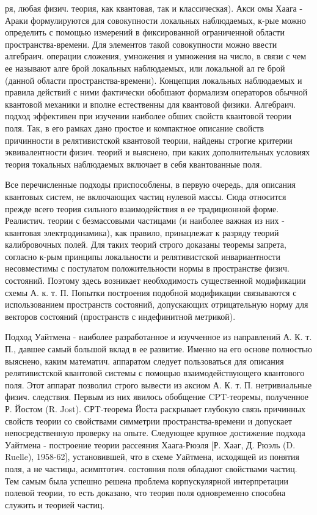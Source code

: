 \documentclass[10pt]{article}
\begin{document}
ря, любая физич. теория, как квантовая, так и классическая). Акси омы Хаага - Араки формулируются для совокупности локальных наблюдаемых, к-рые можно определить с помощью измерений в фиксированной ограниченной области пространства-времени. Для элементов такой совокупности можно ввести алгебраич. операции сложения, умножения и умножения на число, в связи с чем ее называют алге брой локальных наблюдаемых, или локальной ал ге брой (данной области пространства-времени). Концепция локальных наблюдаемых и правила действий с ними фактически обобшают формализм операторов обычной квантовой механики и вполне естественны для квантовой физики. Алгебраич. подход эффективен при изучении наиболее обших свойств квантовой теории поля. Так, в его рамках дано простое и компактное описание свойств причинности в релятивистской квантовой теории, найдены строгие критерии эквивалентности физич. теорий и выяснено, при каких дополнительных условиях теория токальных наблюдаемых включает в себя квантованные поля.



Все перечисленные подходы приспособлены, в первую очередь, для описания квантовых систем, не включающих частиц нулевой массы. Сюда относится прежде всего теория сильного взаимодействия в ее традиционной форме. Реалистич. теории с безмассовыми частицами (и наиболее важная из них - квантовая электродинамика), как правило, принацлежат к разряду теорий калибровочных полей. Для таких теорий строго доказаны теоремы запрета, согласно к-рым принципы локальности и релятивистской инвариантности несовместимы с постулатом положительности нормы в пространстве физич. состояний. Поэтому здесь возникает необходимость существенной модификации схемы А. к. т. П. Попытки построения подобной модификации связываются с использованием пространств состояний, допускающих отрицательную норму для векторов состояний (пространств с индефинитной метрикой).



Подход Уайтмена - наиболее разработанное и изучченное из направлений А. К. т. П., давшее самый большой вклад в ее развитие. Именно на его основе полностью выяснено, каким математич. аппаратом следует пользоваться для описания релятивистской квантовой системы с помощью взаимодействующего квантового поля. Этот аппарат позволил строго вывести из аксиом А. К. т. П. нетривиальные физич. следствия. Первым из них явилось обобщение CPT-теоремы, полученное Р. Йостом (R. Jost). СРT-теорема Йоста раскрывает глубокую связь причинных свойств теории со свойствами симметрии пространства-времени и допускает непосредственную проверку на опыте. Следующее крупное достижение подхода Уайтмена - построение теории рассеяния Хаага-Рюэля [Р. Хааг, Д. Рюэль (D. Ruelle), 1958-62], установившей, что в схеме Уайтмена, исходящей из понятия поля, а не частицы, асимптотич. состояния поля обладают свойствами частиц. Тем самым была успешно решена проблема корпускулярной интерпретации полевой теории, то есть доказано, что теория поля одновременно способна служить и теорией частиц.
\end{document}
